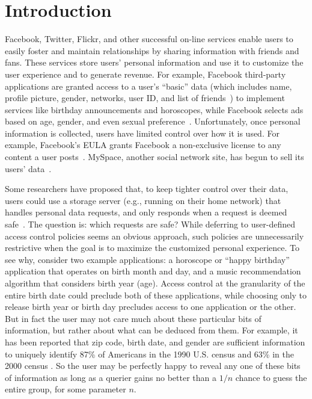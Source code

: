 \section{Introduction}


Facebook, Twitter, Flickr, and other successful on-line services
enable users to easily foster and maintain relationships by sharing
information with friends and fans.  These services store users'
personal information and use it to customize the user experience and
to generate revenue.  For example, Facebook third-party applications
are granted access to a user's ``basic'' data (which includes name,
profile picture, gender, networks, user ID, and list of
friends~\cite{facebook-apps}) to implement services like birthday
announcements and horoscopes, while Facebook selects ads based on age,
gender, and even sexual preference~\cite{guha10}.  Unfortunately, once
personal information is collected, users have limited control over how
it is used.  For example, Facebook's EULA grants Facebook a
non-exclusive license to any content a user posts~\cite{facebook-tos}.
MySpace, another social network site, has begun to sell its
users' data~\cite{myspace-data}.

Some researchers have proposed that, to keep tighter control over
their data, users could use a storage server (e.g., running on their
home network) that handles personal data requests, and only responds
when a request is deemed safe~\cite{prpl,persona}.  The question is:
which requests are safe?
While deferring to user-defined access control policies seems an
obvious approach, such policies are unnecessarily restrictive when the
goal is to maximize the customized personal experience.  To see why,
consider two example applications: a horoscope or ``happy birthday''
application that operates on birth month and day, and a music
recommendation algorithm that considers birth year (age).  Access
control at the granularity of the entire birth date could preclude
both of these applications, while choosing only to release birth year
or birth day precludes access to one application or the other.  But in
fact the user may not care much about these particular bits of
information, but rather about what can be deduced from them.  For
example, it has been reported that zip code, birth date, and gender
are sufficient information to uniquely identify 87\% of Americans in
the 1990 U.S. census \cite{census90} and 63\% in the 2000 census
\cite{golle06revisiting}. So the user may be perfectly happy to reveal
any one of these bits of information as long as a querier gains no
better than a $1 / n$ chance to guess the entire group, for some
parameter $n$.

